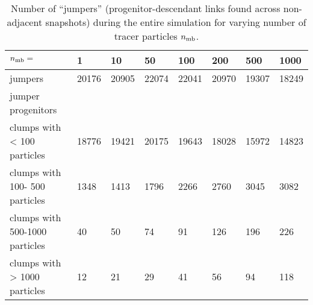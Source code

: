 \begin{table*}
  \caption{Number of ``jumpers'' (progenitor-descendant links found
    across non-adjacent snapshots) during the entire simulation for
    varying number of tracer particles $n_{\rm mb}$.  }
  \label{tab:jumpers}
  {\small

\begin{tabular}[c]{l | p{1cm} | p{1cm} | p{1cm} | p{1cm} | p{1cm} | p{1cm} | p{1cm} |}
    $n_{\rm mb}=$                   & 1           & 10          & 50          & 100         & 200         & 500         & 1000        \\
\hline
    jumpers                   &    20176    &    20905    &    22074    &    22041    &    20970    &    19307    &    18249    \\
\hline
    jumper progenitors & & & & & & & \\
    clumps with <  100 particles    &    18776    &    19421    &    20175    &    19643    &    18028    &    15972    &    14823    \\
    clumps with  100- 500 particles &     1348    &     1413    &     1796    &     2266    &     2760    &     3045    &     3082    \\
    clumps with  500-1000 particles &       40    &       50    &       74    &       91    &      126    &      196    &      226    \\
    clumps with > 1000 particles    &       12    &       21    &       29    &       41    &       56    &       94    &      118    \\
\hline
\end{tabular}


} %
\end{table*}
